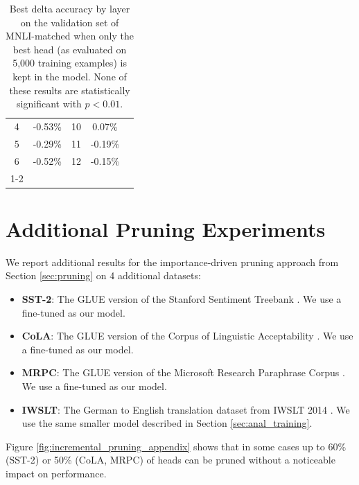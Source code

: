 \begin{table}[h!]
\begin{minipage}{0.45\textwidth}
\begin{tabular}{c|ccc|c}
4 & \color{Maroon} -0.53\% & 10 & \color{NavyBlue} 0.07\% \\
5 & \color{Maroon} -0.29\% & 11 & \color{Maroon} -0.19\% \\
6 & \color{Maroon} -0.52\% & 12 & \color{Maroon} -0.15\% \\
\cline{1-2}\cline{4-5}
\end{tabular}
\caption{\label{tab:bertmnli_ablation_all_but_add} Best delta accuracy by layer on the validation set of MNLI-matched when only the best head (as evaluated on 5,000 training examples) is kept in the \bertmnli{} model. None of these results are statistically significant with $p<0.01$.}
\end{minipage}
\end{table}

\section{Additional Pruning Experiments}
\label{sec:additional_pruning}

We report additional results for the importance-driven pruning approach from Section \ref{sec:pruning} on 4 additional datasets:

\begin{itemize}
    \item \textbf{SST-2}: The GLUE version of the Stanford Sentiment Treebank \citep{socher2013recursive}. We use a fine-tuned \bertmnli{} as our model.
    \item \textbf{CoLA}: The GLUE version of the Corpus of Linguistic Acceptability \citep{Warstadt2018NeuralNA}. We use a fine-tuned \bertmnli{} as our model.
    \item \textbf{MRPC}: The GLUE version of the Microsoft Research Paraphrase Corpus \citep{brocket2005automatically}. We use a fine-tuned \bertmnli{} as our model.
    \item \textbf{IWSLT}: The German to English translation dataset from IWSLT 2014 \citep{Cettolo2015ReportOT}. We use the same smaller model described in Section \ref{sec:anal_training}.
\end{itemize}

Figure \ref{fig:incremental_pruning_appendix} shows that in some cases up to 60\% (SST-2) or 50\% (CoLA, MRPC) of heads can be pruned without a noticeable impact on performance.

